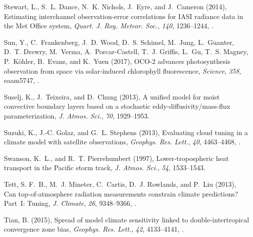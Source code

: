 \documentclass[draft]{agujournal}
\begin{document}
\begin{thebibliography}{196}
Stewart, L., S.~L. Dance, N.~K. Nichols, J.~Eyre, and J.~Cameron (2014),
  Estimating interchannel observation-error correlations for {IASI} radiance
  data in the {M}et {O}ffice system, \textit{Quart. J. Roy. Meteor. Soc.},
  \textit{140}, 1236--1244, .

Sun, Y., C.~Frankenberg, J.~D. Wood, D.~S. Schimel, M.~Jung, L.~Guanter, D.~T.
  Drewry, M.~Verma, A.~Porcar-Castell, T.~J. Griffis, L.~Gu, T.~S. Magney,
  P.~K{\"o}hler, B.~Evans, and K.~Yuen (2017), {OCO-2} advances photosynthesis
  observation from space via solar-induced chlorophyll fluorescence,
  \textit{Science}, \textit{358}, eaam5747, .

Suselj, K., J.~Teixeira, and D.~Chung (2013), A unified model for moist
  convective boundary layers based on a stochastic eddy-diffusivity/mass-flux
  parameterization, \textit{J. Atmos. Sci.}, \textit{70}, 1929--1953.

Suzuki, K., J.-C. Golaz, and G.~L. Stephens (2013), Evaluating cloud tuning in
  a climate model with satellite observations, \textit{Geophys. Res. Lett.},
  \textit{40}, 4463--4468, .

Swanson, K.~L., and R.~T. Pierrehumbert (1997), Lower-tropospheric heat
  transport in the {P}acific storm track, \textit{J. Atmos. Sci.}, \textit{54},
  1533--1543.

Tett, S. F.~B., M.~J. Mineter, C.~Cartis, D.~J. Rowlands, and P.~Liu (2013),
  Can top-of-atmosphere radiation measurements constrain climate predictions?
  {Part~I}: {T}uning, \textit{J. Climate}, \textit{26}, 9348--9366,
  .

Tian, B. (2015), Spread of model climate sensitivity linked to
  double-intertropical convergence zone bias, \textit{Geophys. Res. Lett.},
  \textit{42}, 4133--4141, .


\end{thebibliography}
\end{document}
